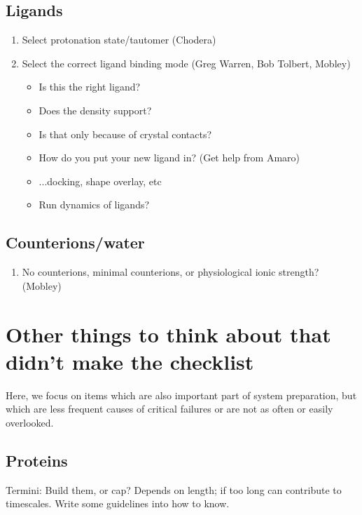 \documentclass[9pt]{livecoms}
\begin{document}
\subsection{Ligands}

\begin{enumerate}
\item Select protonation state/tautomer (Chodera)
\item Select the correct ligand binding mode (Greg Warren, Bob Tolbert, Mobley) %
    \begin{itemize}
    \item Is this the right ligand?
    \item Does the density support?
    \item Is that only because of crystal contacts?
    \item How do you put your new ligand in? (Get help from Amaro)
    \item ...docking, shape overlay, etc
    \item Run dynamics of ligands?
    \end{itemize}
\end{enumerate}

\subsection{Counterions/water}

\begin{enumerate}
\item No counterions, minimal counterions, or physiological ionic strength? (Mobley)

\end{enumerate}

\section{Other things to think about that didn't make the checklist}

Here, we focus on items which are also important part of system preparation, but which are less frequent causes of critical failures or are not as often or easily overlooked.

\subsection{Proteins}

Termini: Build them, or cap? Depends on length; if too long can contribute to timescales. Write some guidelines into how to know. %
\end{document}
